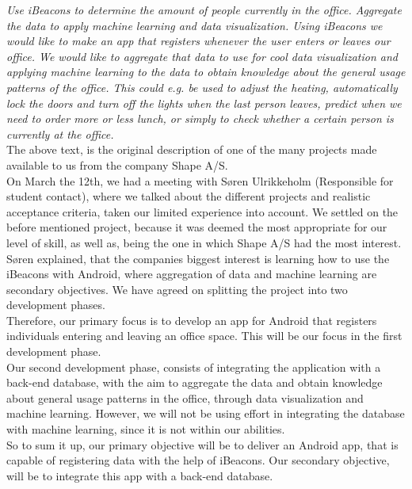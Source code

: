 \documentclass[12pt]{article}
\begin{document}
\textit{Use iBeacons to determine the amount of people currently in the office. Aggregate the data to apply machine learning and data visualization.
Using iBeacons we would like to make an app that registers whenever the user enters or leaves our office. We would like to aggregate that data to use for cool data visualization and applying machine learning to the data to obtain knowledge about the general usage patterns of the office. This could e.g. be used to adjust the heating, automatically lock the doors and turn off the lights when the last person leaves, predict when we need to order more or less lunch, or simply to check whether a certain person is currently at the office.} \cite{website}\\

The above text, is the original description of one of the many projects made available to us from the company Shape A/S.\\

On March the 12th, we had a meeting with S\o ren Ulrikkeholm (Responsible for student contact), where we talked about the different projects and realistic acceptance criteria, taken our limited experience into account. We settled on the before mentioned project, because it was deemed the most appropriate for our level of skill, as well as, being the one in which Shape A/S had the most interest.\\

S\o ren explained, that the companies biggest interest is learning how to use the iBeacons with Android, where aggregation of data and machine learning are secondary objectives. We have agreed on splitting the project into two development phases.\\

Therefore, our primary focus is to develop an app for Android that registers individuals entering and leaving an office space. This will be our focus in the first development phase.\\

Our second development phase, consists of integrating the application with a back-end database, with the aim to aggregate the data and obtain knowledge about general usage patterns in the office, through data visualization and machine learning. However, we will not be using effort in integrating the database with machine learning, since it is not within our abilities.\\

So to sum it up, our primary objective will be to deliver an Android app, that is capable of registering data with the help of iBeacons. Our secondary objective, will be to integrate this app with a back-end database.\\
\end{document}
